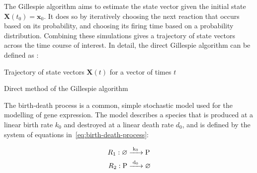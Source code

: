 The Gillespie algorithm aims to estimate the state vector given the initial state $\mathbf{X}(t_{0}) = \mathbf{x}_{0}$.
It does so by iteratively choosing the next reaction that occurs based on its probability, and choosing its firing time based on a probability distribution.
Combining these simulations gives a trajectory of state vectors across the time course of interest.
In detail, the direct Gillespie algorithm can be defined as \parencite{gillespieStochasticSimulationChemical2007}:

\begin{algorithm}[H]
  \SetAlgoLined
  \KwRet Trajectory of state vectors $\mathbf{X}(t)$ for a vector of times $t$\;
  \caption{Direct method of the Gillespie algorithm}
  \label{alg:gillespie}
\end{algorithm}

The birth-death process is a common, simple stochastic model used for the modelling of gene expression.
The model describes a species that is produced at a linear birth rate $k_{0}$ and destroyed at a linear death rate $d_{0}$, and is defined by the system of equations in~\ref{eq:birth-death-process}:

\begin{equation}
  \begin{aligned}
    R_{1}: \varnothing \ce{ &->[k_{0}] P}\\
    R_{2}: \ce{P &->[d_{0}]} \varnothing
  \end{aligned}
  \label{eq:birth-death-process}
\end{equation}

